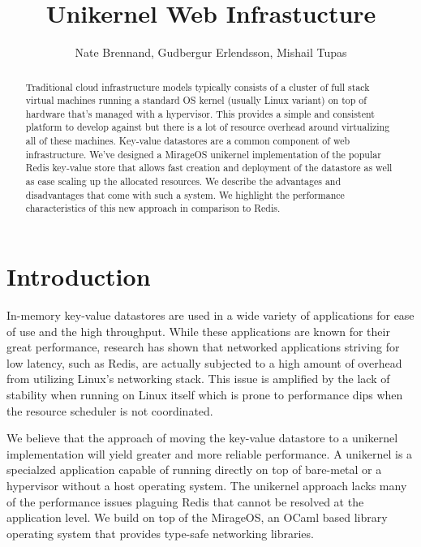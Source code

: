 \documentclass[english,10pt,twocolumn]{article}
\begin{document}
\title{Unikernel Web Infrastucture}
\author{Nate Brennand, Gudbergur Erlendsson, Mishail Tupas}
\date{}
\maketitle
\thispagestyle{empty}

\begin{abstract}
  Traditional cloud infrastructure models typically consists of a cluster of full stack virtual machines running a standard OS kernel (usually Linux variant) on top of hardware that's managed with a hypervisor. This provides a simple and consistent platform to develop against but there is a lot of resource overhead around virtualizing all of these machines.
  Key-value datastores are a common component of web infrastructure.
  We've designed a MirageOS\cite{mirage} unikernel implementation of the popular Redis\cite{redis} key-value store that allows fast creation and deployment of the datastore as well as ease scaling up the allocated resources.
  We describe the advantages and disadvantages that come with such a system.
  We highlight the performance characteristics of this new approach in comparison to Redis.
\end{abstract}

\section{Introduction}
In-memory key-value datastores are used in a wide variety of applications for ease of use and the high throughput.
While these applications are known for their great performance, research has shown that networked applications striving for low latency, such as Redis, are actually subjected to a high amount of overhead from utilizing Linux's networking stack.\cite{arrakis}
This issue is amplified by the lack of stability when running on Linux itself which is prone to performance dips when the resource scheduler is not coordinated.

We believe that the approach of moving the key-value datastore to a unikernel implementation will yield greater and more reliable performance.
A unikernel is a specialzed application capable of running directly on top of bare-metal or a hypervisor without a host operating system.
The unikernel approach lacks many of the performance issues plaguing Redis that cannot be resolved at the application level.
We build on top of the MirageOS\cite{mirage}, an OCaml based library operating system that provides type-safe networking libraries.
\end{document}
